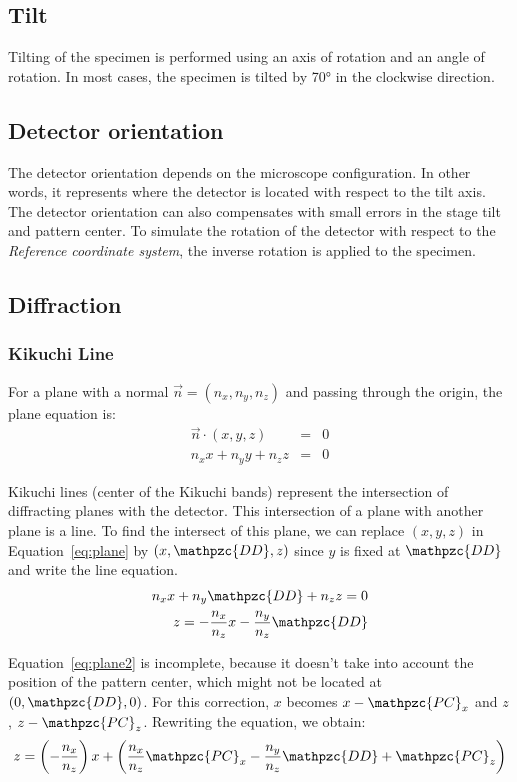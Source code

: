 \documentclass[letterpaper]{article}
\newcommand{\var}[1]{\mathpzc{#1}}
\begin{document}
	\subsection{Tilt}
	Tilting of the specimen is performed using an axis of rotation and an angle of rotation. 
	In most cases, the specimen is tilted by \ang{70} in the clockwise direction.
	
	\subsection{Detector orientation}
	The detector orientation depends on the microscope configuration.
	In other words, it represents where the detector is located with respect to the tilt axis.
	The detector orientation can also compensates with small errors in the stage tilt and pattern center.\cite{OxfordChannel5}
	To simulate the rotation of the detector with respect to the \emph{Reference coordinate system}, the inverse rotation is applied to the specimen.
	
	\subsection{Diffraction}
	\subsubsection{Kikuchi Line}
	For a plane with a normal $\vec{n} = (n_x, n_y, n_z)$ and passing through the origin, the plane equation is:
	\begin{eqnarray}
		\vec{n} \cdot (x,y,z) & = & 0\\\nonumber
		n_xx + n_yy + n_zz & = & 0 
		\label{eq:plane}
	\end{eqnarray}
	
	Kikuchi lines (center of the Kikuchi bands) represent the intersection of diffracting planes with the detector.  
	This intersection of a plane with another plane is a line.
	To find the intersect of this plane, we can replace $(x,y,z)$ in Equation~\ref{eq:plane} by $(x, \var{DD}, z)$ since $y$ is fixed at $\var{DD}$ and write the line equation.
	\begin{eqnarray}
		n_x x + n_y \var{DD} + n_z z = 0 \\\nonumber
		z = -\frac{n_x}{n_z}x - \frac{n_y}{n_z}\var{DD}
		\label{eq:plane2}
	\end{eqnarray}
	
	Equation~\ref{eq:plane2} is incomplete, because it doesn't take into account the position of the pattern center, which might not be located at $(0,\var{DD},0)$. 
	For this correction, $x$ becomes $x-\var{PC}_x$ and $z$, $z-\var{PC}_z$.
	Rewriting the equation, we obtain:
	\begin{eqnarray}
		z = \left(-\frac{n_x}{n_z}\right)x + \left(\frac{n_x}{n_z}\var{PC}_x - \frac{n_y}{n_z}\var{DD} + \var{PC}_z\right)
		\label{eq:plane3}
	\end{eqnarray}
	
\end{document}
